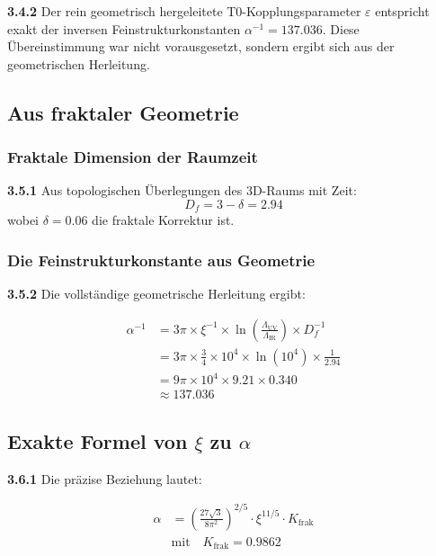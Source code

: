 \documentclass[12pt,a4paper]{article}
\newcommand{\xipar}{\xi}
\begin{document}
	\begin{tcolorbox}[colback=blue!5!white,colframe=blue!75!black,title=Bemerkenswerte Übereinstimmung]
		\textbf{3.4.2} Der rein geometrisch hergeleitete T0-Kopplungsparameter $\varepsilon$ entspricht exakt der inversen Feinstrukturkonstanten $\alpha^{-1} = 137.036$. Diese Übereinstimmung war nicht vorausgesetzt, sondern ergibt sich aus der geometrischen Herleitung.
	\end{tcolorbox}
	
	\subsection{Aus fraktaler Geometrie}
	
	\subsubsection{Fraktale Dimension der Raumzeit}
	
	\noindent \textbf{3.5.1} Aus topologischen Überlegungen des 3D-Raums mit Zeit:
	\begin{equation}
		D_f = 3 - \delta = 2.94
	\end{equation}
	wobei $\delta = 0.06$ die fraktale Korrektur ist.
	
	\subsubsection{Die Feinstrukturkonstante aus Geometrie}
	
	\noindent \textbf{3.5.2} Die vollständige geometrische Herleitung ergibt:
	\begin{keyresult}
		\begin{align}
			\alpha^{-1} &= 3\pi \times \xipar^{-1} \times \ln\left(\frac{\Lambda_{\text{UV}}}{\Lambda_{\text{IR}}}\right) \times D_f^{-1} \\
			&= 3\pi \times \frac{3}{4} \times 10^{4} \times \ln(10^{4}) \times \frac{1}{2.94} \\
			&= 9\pi \times 10^{4} \times 9.21 \times 0.340 \\
			&\approx 137.036
		\end{align}
	\end{keyresult}
	
	\subsection{Exakte Formel von $\xipar$ zu $\alpha$}
	
	\noindent \textbf{3.6.1} Die präzise Beziehung lautet:
	\begin{keyresult}
		\begin{align}
			\alpha &= \left( \frac{27 \sqrt{3}}{8 \pi^2} \right)^{2/5} \cdot \xipar^{11/5} \cdot K_{\text{frak}} \\
			&\text{mit} \quad K_{\text{frak}} = 0.9862
		\end{align}
	\end{keyresult}
	
\end{document}

